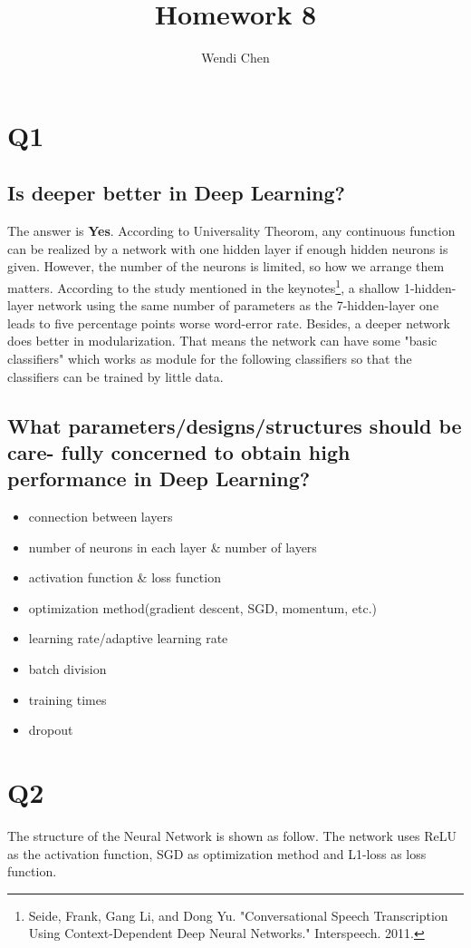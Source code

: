 \documentclass[a4paper]{article}
\title{\textbf{Homework 8}}
\author{Wendi Chen}
\date{}
\begin{document}
\maketitle

\section{Q1}
\subsection{Is deeper better in Deep Learning?}
The answer is \textbf{Yes}. 
According to Universality Theorom, any continuous function can be realized by a 
network with one hidden layer if enough hidden neurons is given. 
However, the number of the neurons is limited, so how we arrange them matters. 
According to the study mentioned in the keynotes\footnote{Seide, Frank, Gang Li, and Dong Yu. 
"Conversational Speech Transcription Using Context-Dependent Deep Neural Networks." Interspeech. 2011.}, 
a shallow 1-hidden-layer network using the same number of parameters as the 
7-hidden-layer one leads to five percentage points worse word-error rate.
Besides, a deeper network does better in modularization.
That means the network can have some "basic classifiers" which works as module for the following classifiers 
so that the classifiers can be trained by little data.
\subsection{What parameters/designs/structures should be care-
fully concerned to obtain high performance in Deep Learning?}
\begin{itemize}
\item connection between layers
\item number of neurons in each layer \& number of layers
\item activation function \& loss function
\item optimization method(gradient descent, SGD, momentum, etc.)
\item learning rate/adaptive learning rate
\item batch division
\item training times
\item dropout
\end{itemize}

\newpage
\section{Q2}
The structure of the Neural Network is shown as follow. 
The network uses ReLU as the activation function, SGD as optimization method and L1-loss as loss function.
\end{document}
